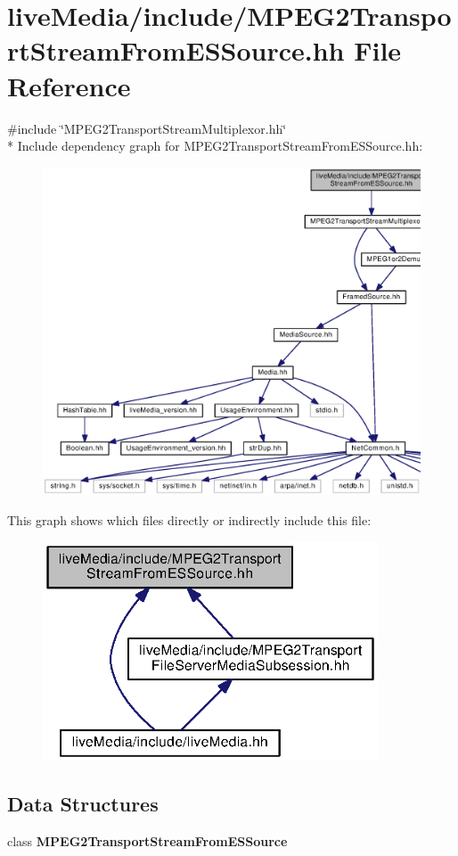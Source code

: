 \section{live\+Media/include/\+M\+P\+E\+G2\+Transport\+Stream\+From\+E\+S\+Source.hh File Reference}
\label{MPEG2TransportStreamFromESSource_8hh}
{\ttfamily \#include \char`\"{}M\+P\+E\+G2\+Transport\+Stream\+Multiplexor.\+hh\char`\"{}}\\*
Include dependency graph for M\+P\+E\+G2\+Transport\+Stream\+From\+E\+S\+Source.\+hh\+:
\nopagebreak
\begin{figure}[H]
\begin{center}
\leavevmode
\includegraphics[width=350pt]{MPEG2TransportStreamFromESSource_8hh__incl}
\end{center}
\end{figure}
This graph shows which files directly or indirectly include this file\+:
\nopagebreak
\begin{figure}[H]
\begin{center}
\leavevmode
\includegraphics[width=282pt]{MPEG2TransportStreamFromESSource_8hh__dep__incl}
\end{center}
\end{figure}
\subsection*{Data Structures}
\begin{DoxyCompactItemize}
\item 
class {\bf M\+P\+E\+G2\+Transport\+Stream\+From\+E\+S\+Source}
\end{DoxyCompactItemize}
